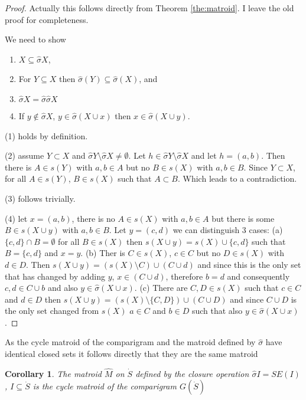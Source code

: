 \documentclass[a4paper,12pt]{article}
\newtheorem{corollary}{Corollary}
\begin{document}
\begin{proof}
  Actually this follows directly from Theorem \ref{the:matroid}. I
  leave the old proof for completeness.

  We need to show
  \begin{enumerate}
  \item $X \subseteq \hat{\sigma} X$, 
  \item For $Y \subseteq X$ then $\hat{\sigma}(Y) \subseteq \hat{\sigma}(X)$, and 
  \item $\hat{\sigma} X = \hat{\sigma} \hat{\sigma} X$
  \item If $y \notin \hat{\sigma} X$, $y \in \hat{\sigma}(X \cup x)$ then $x \in
    \hat{\sigma}(X \cup y)$.
  \end{enumerate}
  (1) holds by definition. 

  (2) assume $Y \subset X$ and $\hat{\sigma} Y \setminus \hat{\sigma} X \neq
  \emptyset$. Let $h \in \hat{\sigma} Y \setminus \hat{\sigma} X$ and let $h =
  (a,b)$. Then there is $A \in s(Y)$ with $a,b \in A$ but no $B \in
  s(X)$ with $a,b \in B$. Since $Y \subset X$, for all $A \in s(Y)$,
  $B \in s(X)$ such that $A \subset B$. Which leads to a
  contradiction. 

  (3) follows trivially. 

  (4) let $x = (a,b)$, there is no $A \in s(X)$ with $a,b \in A$ but
  there is some $B \in s(X \cup y)$ with $a,b \in B$. Let $y = (c,d)$
  we can distinguish 3 cases: (a) $\{c,d\} \cap B = \emptyset$ for all
  $B \in s(X)$ then $s(X \cup y) = s(X) \cup \{c,d\}$ such that $B =
  \{c,d\}$ and $x = y$. (b) Ther is $C \in s(X)$, $c \in C$ but
  no $D \in s(X)$ with $d \in D$. Then $s(X \cup y) = (s(X)\setminus C) \cup (C
  \cup d)$ and since this is the only set that has changed by adding
  $y$, $x \in (C\cup d)$, therefore $b = d$ and consequently
  $c,d \in C\cup b$ and also $y \in \hat{\sigma}(X \cup x)$. (c) There are
  $C,D \in s(X)$ such that $c \in C$ and $d \in D$ then $s(X \cup y) =
  (s(X)\setminus \{C,D\})\cup (C \cup D)$ and since $C\cup D$ is the
  only set changed from $s(X)$ $a \in C$ and $b \in D$ such that also
  $y \in \hat{\sigma}(X\cup x)$. 
\end{proof}

As the cycle matroid of the comparigram and the matroid defined by
$\hat{\sigma}$ have identical closed sets it follows directly that
they are the same matroid

\begin{corollary}
  The matroid $\hat{M}$ on $\dot{S}$ defined by the closure operation 
  $\hat{\sigma}I = SE(I)$, $I \subseteq \dot{S}$ is the cycle matroid
  of the comparigram $G(\dot{S})$
\end{corollary}
\end{document}
